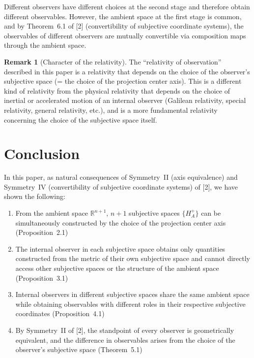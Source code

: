 \documentclass[a4paper,11pt]{article}
\theoremstyle{definition}
\newtheorem{remark}[theorem]{Remark}
\begin{document}
Different observers have different choices at the second stage and therefore obtain different observables. However, the ambient space at the first stage is common, and by Theorem~6.1 of {[2]} (convertibility of subjective coordinate systems), the observables of different observers are mutually convertible via composition maps through the ambient space.

\begin{remark}[Character of the relativity]
The ``relativity of observation'' described in this paper is a relativity that depends on the choice of the observer's subjective space (= the choice of the projection center axis). This is a different kind of relativity from the physical relativity that depends on the choice of inertial or accelerated motion of an internal observer (Galilean relativity, special relativity, general relativity, etc.), and is a more fundamental relativity concerning the choice of the subjective space itself.
\end{remark}

\section{Conclusion}

In this paper, as natural consequences of Symmetry~II (axis equivalence) and Symmetry~IV (convertibility of subjective coordinate systems) of {[2]}, we have shown the following:

\begin{enumerate}
\item From the ambient space \(\mathbb{R}^{n+1}\), \(n+1\) subjective spaces \(\{H_A^+\}\) can be simultaneously constructed by the choice of the projection center axis (Proposition~2.1)

\item The internal observer in each subjective space obtains only quantities constructed from the metric of their own subjective space and cannot directly access other subjective spaces or the structure of the ambient space (Proposition~3.1)

\item Internal observers in different subjective spaces share the same ambient space while obtaining observables with different roles in their respective subjective coordinates (Proposition~4.1)

\item By Symmetry~II of {[2]}, the standpoint of every observer is geometrically equivalent, and the difference in observables arises from the choice of the observer's subjective space (Theorem~5.1)
\end{enumerate}
\end{document}
